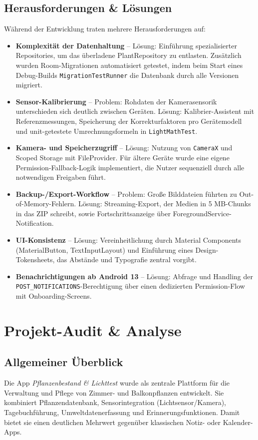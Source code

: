 \documentclass[14pt,a4paper]{report}
\begin{document}
\section{Herausforderungen \& Lösungen}
Während der Entwicklung traten mehrere Herausforderungen auf:
\begin{itemize}
    \item \textbf{Komplexität der Datenhaltung} – Lösung: Einführung spezialisierter Repositories, um das überladene PlantRepository zu entlasten. Zusätzlich wurden Room-Migrationen automatisiert getestet, indem beim Start eines Debug-Builds \texttt{MigrationTestRunner} die Datenbank durch alle Versionen migriert.
    \item \textbf{Sensor-Kalibrierung} – Problem: Rohdaten der Kamerasensorik unterschieden sich deutlich zwischen Geräten. Lösung: Kalibrier-Assistent mit Referenzmessungen, Speicherung der Korrekturfaktoren pro Gerätemodell und unit-getestete Umrechnungsformeln in \texttt{LightMathTest}.
    \item \textbf{Kamera- und Speicherzugriff} – Lösung: Nutzung von \texttt{CameraX} und Scoped Storage mit FileProvider. Für ältere Geräte wurde eine eigene Permission-Fallback-Logik implementiert, die Nutzer sequenziell durch alle notwendigen Freigaben führt.
    \item \textbf{Backup-/Export-Workflow} – Problem: Große Bilddateien führten zu Out-of-Memory-Fehlern. Lösung: Streaming-Export, der Medien in 5 MB-Chunks in das ZIP schreibt, sowie Fortschrittsanzeige über ForegroundService-Notification.
    \item \textbf{UI-Konsistenz} – Lösung: Vereinheitlichung durch Material Components (MaterialButton, TextInputLayout) und Einführung eines Design-Tokensheets, das Abstände und Typografie zentral vorgibt.
    \item \textbf{Benachrichtigungen ab Android 13} – Lösung: Abfrage und Handling der \texttt{POST\_NOTIFICATIONS}-Berechtigung über einen dedizierten Permission-Flow mit Onboarding-Screens.
\end{itemize}



\chapter{Projekt-Audit \& Analyse}

\section{Allgemeiner Überblick}
Die App \textit{Pflanzenbestand \& Lichttest} wurde als zentrale Plattform für die Verwaltung und Pflege von Zimmer- und Balkonpflanzen entwickelt. 
Sie kombiniert Pflanzendatenbank, Sensorintegration (Lichtsensor/Kamera), Tagebuchführung, Umweltdatenerfassung und Erinnerungsfunktionen. 
Damit bietet sie einen deutlichen Mehrwert gegenüber klassischen Notiz- oder Kalender-Apps.
\end{document}
